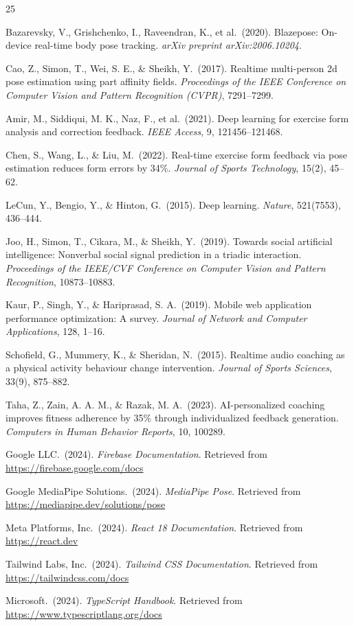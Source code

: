 \documentclass[12pt,a4paper]{article}
\begin{document}
\begin{thebibliography}{25}

Bazarevsky, V., Grishchenko, I., Raveendran, K., et al.\ (2020).
Blazepose: On-device real-time body pose tracking.
\textit{arXiv preprint arXiv:2006.10204}.

Cao, Z., Simon, T., Wei, S. E., \& Sheikh, Y.\ (2017).
Realtime multi-person 2d pose estimation using part affinity fields.
\textit{Proceedings of the IEEE Conference on Computer Vision and Pattern 
Recognition (CVPR)}, 7291--7299.

Amir, M., Siddiqui, M. K., Naz, F., et al.\ (2021).
Deep learning for exercise form analysis and correction feedback.
\textit{IEEE Access}, 9, 121456--121468.

Chen, S., Wang, L., \& Liu, M.\ (2022).
Real-time exercise form feedback via pose estimation reduces form errors by 34\%.
\textit{Journal of Sports Technology}, 15(2), 45--62.

LeCun, Y., Bengio, Y., \& Hinton, G.\ (2015).
Deep learning.
\textit{Nature}, 521(7553), 436--444.

Joo, H., Simon, T., Cikara, M., \& Sheikh, Y.\ (2019).
Towards social artificial intelligence: Nonverbal social signal prediction 
in a triadic interaction.
\textit{Proceedings of the IEEE/CVF Conference on Computer Vision and Pattern 
Recognition}, 10873--10883.

Kaur, P., Singh, Y., \& Hariprasad, S. A.\ (2019).
Mobile web application performance optimization: A survey.
\textit{Journal of Network and Computer Applications}, 128, 1--16.

Schofield, G., Mummery, K., \& Sheridan, N.\ (2015).
Realtime audio coaching as a physical activity behaviour change intervention.
\textit{Journal of Sports Sciences}, 33(9), 875--882.

Taha, Z., Zain, A. A. M., \& Razak, M. A.\ (2023).
AI-personalized coaching improves fitness adherence by 35\% through 
individualized feedback generation.
\textit{Computers in Human Behavior Reports}, 10, 100289.

Google LLC.\ (2024).
\textit{Firebase Documentation}.
Retrieved from \url{https://firebase.google.com/docs}

Google MediaPipe Solutions.\ (2024).
\textit{MediaPipe Pose}.
Retrieved from \url{https://mediapipe.dev/solutions/pose}

Meta Platforms, Inc.\ (2024).
\textit{React 18 Documentation}.
Retrieved from \url{https://react.dev}

Tailwind Labs, Inc.\ (2024).
\textit{Tailwind CSS Documentation}.
Retrieved from \url{https://tailwindcss.com/docs}

Microsoft.\ (2024).
\textit{TypeScript Handbook}.
Retrieved from \url{https://www.typescriptlang.org/docs}

\end{thebibliography}
\end{document}
